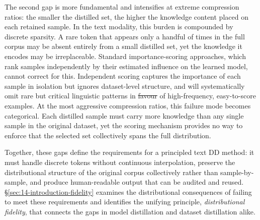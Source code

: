 \documentclass[12pt, a4paper, twoside]{book}
\makeatletter
\numberwithin{equation}{chapter}
\theoremstyle{plain}
\theoremstyle{definition}
\theoremstyle{remark}
\newenvironment{foldable}{}{}
\providecommand{\DIFaddtex}[1]{{\protect\color{blue}\uwave{#1}}} %
\providecommand{\DIFdeltex}[1]{{\protect\color{red}\sout{#1}}} %
\providecommand{\DIFaddbegin}{} %
\providecommand{\DIFaddend}{} %
\providecommand{\DIFdelbegin}{} %
\providecommand{\DIFdelend}{} %
\providecommand{\DIFadd}[1]{\texorpdfstring{\DIFaddtex{#1}}{#1}} %
\providecommand{\DIFdel}[1]{\texorpdfstring{\DIFdeltex{#1}}{}} %
\newcommand{\DIFscaledelfig}{0.5}
\newlength{\DIFdelgraphicswidth} %
\newlength{\DIFdelgraphicsheight} %
\newcommand{\DIFaddincludegraphics}[2][]{{\color{blue}\fbox{\DIFOincludegraphics[#1]{#2}}}} %
\newcommand{\DIFdelincludegraphics}[2][]{%
\sbox{\DIFdelgraphicsbox}{\DIFOincludegraphics[#1]{#2}}%
\settoboxwidth{\DIFdelgraphicswidth}{\DIFdelgraphicsbox} %
\settoboxtotalheight{\DIFdelgraphicsheight}{\DIFdelgraphicsbox} %
\scalebox{\DIFscaledelfig}{%
\parbox[b]{\DIFdelgraphicswidth}{\usebox{\DIFdelgraphicsbox}\\[-\baselineskip] \rule{\DIFdelgraphicswidth}{0em}}\llap{\resizebox{\DIFdelgraphicswidth}{\DIFdelgraphicsheight}{%
\setlength{\unitlength}{\DIFdelgraphicswidth}%
\begin{picture}(1,1)%
\thicklines\linethickness{2pt} %
{\color[rgb]{1,0,0}\put(0,0){\framebox(1,1){}}}%
{\color[rgb]{1,0,0}\put(0,0){\line( 1,1){1}}}%
{\color[rgb]{1,0,0}\put(0,1){\line(1,-1){1}}}%
\end{picture}%
}\hspace*{3pt}}} %
} %
\DeclareRobustCommand{\DIFaddbegin}{\DIFOaddbegin \let\includegraphics\DIFaddincludegraphics} %
\DeclareRobustCommand{\DIFaddend}{\DIFOaddend \let\includegraphics\DIFOincludegraphics} %
\DeclareRobustCommand{\DIFdelbegin}{\DIFOdelbegin \let\includegraphics\DIFdelincludegraphics} %
\DeclareRobustCommand{\DIFdelend}{\DIFOaddend \let\includegraphics\DIFOincludegraphics} %
\let\sout@orig\sout %
\renewcommand{\sout}[1]{\ifmmode\text{\sout@orig{\ensuremath{#1}}}\else\sout@orig{#1}\fi} %
\makeatother
\begin{document}
\begin{foldable}
  The second gap is more fundamental and intensifies at extreme compression ratios: the smaller the distilled set, the higher the knowledge content placed on each retained sample.
  In the text modality, this burden is compounded by discrete sparsity.
  A rare token that appears only a handful of times in the full corpus may be absent entirely from a small distilled set, yet the knowledge it encodes may be irreplaceable.
  Standard importance-scoring approaches, which rank samples independently by their estimated influence on the learned model, cannot correct for this.
  Independent scoring captures the importance of each sample in isolation but ignores dataset-level structure, and will systematically omit rare but critical linguistic patterns in \DIFdelbegin \DIFdel{favour }\DIFdelend \DIFaddbegin \DIFadd{favor }\DIFaddend of high-frequency, easy-to-score examples.
  At the most aggressive compression ratios, this failure mode becomes categorical.
  Each distilled sample must carry more knowledge than any single sample in the original dataset, yet the scoring mechanism provides no way to enforce that the selected set collectively spans the full distribution.
\end{foldable}

\begin{foldable}
  Together, these gaps define the requirements for a principled text \ac{DD} method: it must handle discrete tokens without continuous interpolation, preserve the distributional structure of the original corpus collectively rather than sample-by-sample, and produce human-readable output that can be audited and reused.
  \S\ref{sec:14-introduction-fidelity} examines the distributional consequences of failing to meet these requirements and identifies the unifying principle, \textit{distributional fidelity}, that connects the gaps in model distillation and dataset distillation alike.
\end{foldable}
\end{document}
